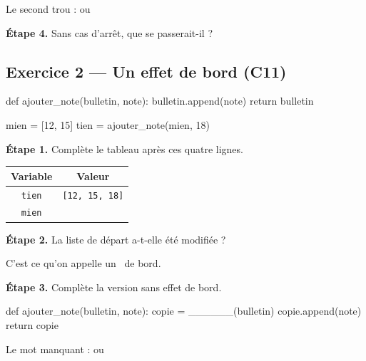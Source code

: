 \medskip
Le second trou : \fbox{\texttt{//}} \qquad ou \qquad \fbox{\texttt{\%}}

\bigskip

\textbf{Étape 4.} Sans cas d'arrêt, que se passerait-il ?

\medskip
\begin{center}
 \qquad {}
\end{center}

\bigskip
\bigskip

\subsection*{Exercice 2 --- Un effet de bord (C11)}

\begin{python}
def ajouter_note(bulletin, note):
    bulletin.append(note)
    return bulletin

mien = [12, 15]
tien = ajouter_note(mien, 18)
\end{python}

\bigskip

\textbf{Étape 1.} Complète le tableau après ces quatre lignes.

\bigskip

\begin{center}
\begin{tabular}{|c|c|}
\hline
\textbf{Variable} & \textbf{Valeur} \\
\hline
\texttt{tien} & \texttt{[12, 15, 18]} \\
\hline
\texttt{mien} & \dotfill \\
\hline
\end{tabular}
\end{center}

\bigskip

\textbf{Étape 2.} La liste de départ a-t-elle été modifiée ?

\medskip
\begin{center}
 \qquad {}
\end{center}

\medskip
C'est ce qu'on appelle un \dotfill\ de bord.

\bigskip

\textbf{Étape 3.} Complète la version sans effet de bord.

\begin{python}
def ajouter_note(bulletin, note):
    copie = ______(bulletin)
    copie.append(note)
    return copie
\end{python}

\medskip
Le mot manquant :  \qquad ou \qquad {}
